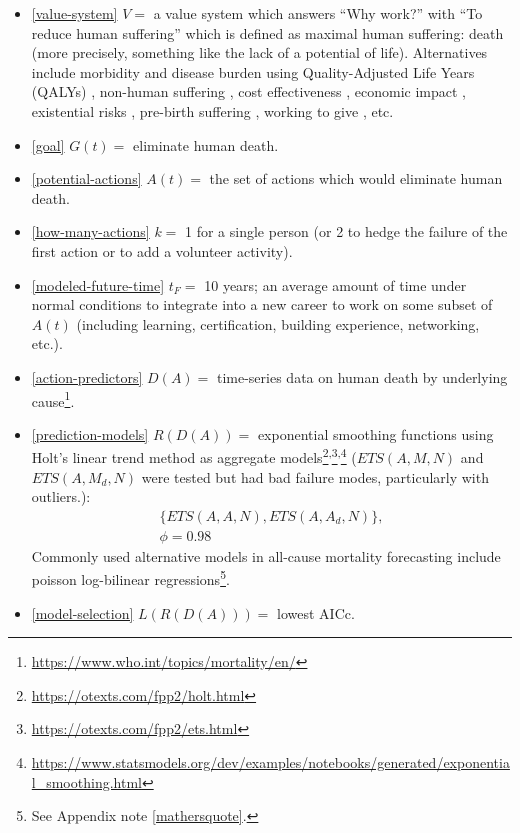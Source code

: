 \documentclass[10pt, a4paper, twocolumn]{IEEEconf}
\newcommand\footnotescontinue{\textsuperscript{,}}
\begin{document}
\begin{itemize}
  \item \eqref{value-system} $V = $ a value system which answers \enquote{Why work?} with \enquote{To reduce human suffering} which is defined as maximal human suffering: death (more precisely, something like the lack of a potential of life).
  Alternatives include morbidity and disease burden using Quality-Adjusted Life Years (QALYs) \citep{weinstein2009qalys,lopez2006global}, non-human suffering \citep{huemer2019dialogues}, cost effectiveness \citep{jamison2017disease,neumann2018comparing,givewellcosteffectiveness}, economic impact \citep{world2009guide}, existential risks \citep{bostrom2013existential}, pre-birth suffering \citep{zane2015abortion}, working to give \citep{macaskill2015doing}, etc.
  \item \eqref{goal} $G(t) = $ eliminate human death.
  \item \eqref{potential-actions} $A(t) = $ the set of actions which would eliminate human death.
  \item \eqref{how-many-actions} $k = $ 1 for a single person (or 2 to hedge the failure of the first action or to add a volunteer activity).
  \item \eqref{modeled-future-time} $t_F = $ 10 years; an average amount of time under normal conditions to integrate into a new career to work on some subset of $A(t)$ (including learning, certification, building experience, networking, etc.).
  \item \eqref{action-predictors} $D(A) = $ time-series data on human death by underlying cause\footnote{\scriptsize{\url{https://www.who.int/topics/mortality/en/}}}.
  \item \eqref{prediction-models} $R(D(A)) = $ exponential smoothing functions using Holt's linear trend method as aggregate models\footnote{\scriptsize{\url{https://otexts.com/fpp2/holt.html}}}\footnotescontinue\footnote{\scriptsize{\url{https://otexts.com/fpp2/ets.html}}}\footnotescontinue\footnote{\scriptsize{\url{https://www.statsmodels.org/dev/examples/notebooks/generated/exponential_smoothing.html}}} ($ETS(A,M,N)$ and $ETS(A,M_d,N)$ were tested but had bad failure modes, particularly with outliers.):
    \begin{equation*}
      \begin{gathered}
        \{ETS(A,A,N),ETS(A,A_d,N)\},\\
        \phi=0.98
      \end{gathered}
    \end{equation*}
    Commonly used alternative models in all-cause mortality forecasting include poisson log-bilinear regressions\footnote{See Appendix note \ref{mathersquote}.}.
  \item \eqref{model-selection} $L(R(D(A))) = $ lowest AICc.
\end{itemize}
\end{document}
